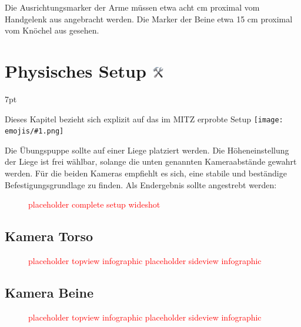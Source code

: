 \documentclass[a4paper, 10pt]{article}
\newcommand{\warn}[1]{\textcolor{red}{#1}}
\newcommand{\emoji}[1]{
    \begingroup\normalfont
    \texttt{[image: emojis/\#1.png]}
    \endgroup
}
\newenvironment{tooltip}{%
\small
\vspace*{-4mm}
    \def\FrameCommand{%
    \hspace{1pt}%
    {\color{tooltippipe}\vrule width 0.7mm}%
    {\color{tooltipshade}\vrule width 1.5mm}%
    \colorbox{tooltipshade}%
    }%
    \MakeFramed{\advance\hsize-\width\FrameRestore}%
    \noindent%
    \begin{adjustwidth}{}{7pt}%
    \vspace{2pt}\vspace{2pt}%
}
{%
    \vspace{2pt}\end{adjustwidth}\endMakeFramed%
}
\begin{document}
Die Ausrichtungsmarker der Arme müssen etwa acht cm proximal vom Handgelenk aus angebracht werden. Die Marker der Beine etwa 15 cm proximal vom Knöchel aus gesehen.

\section{Physisches Setup \includegraphics[height=0.65em]{emojis/hammer-and-wrench.png}}
\label{sec:physical-setup}
\begin{tooltip}
    Dieses Kapitel bezieht sich explizit auf das im MITZ erprobte Setup\emoji{index-pointing-up}
\end{tooltip}
Die Übungspuppe sollte auf einer Liege platziert werden. Die Höheneinstellung der Liege ist frei wählbar, solange die unten genannten Kameraabstände gewahrt werden. Für die beiden Kameras empfiehlt es sich, eine stabile und beständige Befestigungsgrundlage zu finden. Als Endergebnis sollte angestrebt werden:
\begin{figure}[H]
    \centering
    \vspace*{2cm}
    \warn{placeholder complete setup wideshot}
    \vspace*{2cm}
\end{figure}

\subsection{Kamera Torso}
\label{ssec:cam-torso}
\begin{figure}[H]
    \centering
    \vspace*{2cm}
    \warn{placeholder topview infographic}
    \hspace*{2cm}
    \warn{placeholder sideview infographic}
    \vspace*{2cm}
\end{figure}

\subsection{Kamera Beine}
\label{ssec:cam-legs}
\begin{figure}[H]
    \centering
    \vspace*{2cm}
    \warn{placeholder topview infographic}
    \hspace*{2cm}
    \warn{placeholder sideview infographic}
    \vspace*{2cm}
\end{figure}
\end{document}

